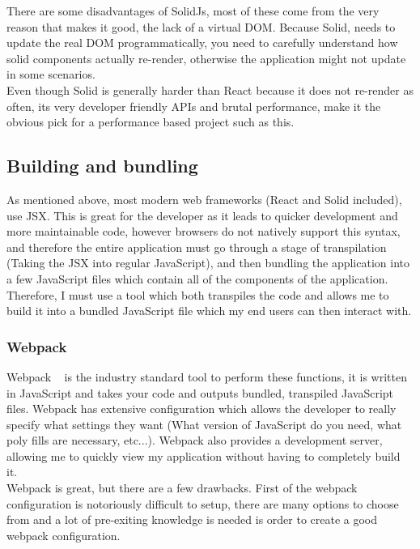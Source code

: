 \documentclass[titlepage]{article}
\begin{document}
There are some disadvantages of SolidJs, most of these come from the very reason that makes it good, the lack of a virtual DOM. Because Solid, needs to update the real DOM programmatically, you need to carefully understand how solid components actually re-render, otherwise the application might not update in some scenarios. \\

Even though Solid is generally harder than React because it does not re-render as often, its very developer friendly APIs and brutal performance, make it the obvious pick for a performance based project such as this.

\subsection{Building and bundling}
As mentioned above, most modern web frameworks (React and Solid included), use JSX. This is great for the developer as it leads to quicker development and more maintainable code, however browsers do not natively support this syntax, and therefore the entire application must go through a stage of transpilation (Taking the JSX into regular JavaScript), and then bundling the application into a few JavaScript files which contain all of the components of the application. Therefore, I must use a tool which both transpiles the code and allows me to build it into a bundled JavaScript file which my end users can then interact with.

\subsubsection{Webpack}
Webpack ~\cite{webpack} is the industry standard tool to perform these functions, it is written in JavaScript and takes your code and outputs bundled, transpiled JavaScript files. Webpack has extensive configuration which allows the developer to really specify what settings they want (What version of JavaScript do you need, what poly fills are necessary, etc...). Webpack also provides a development server, allowing me to quickly view my application without having to completely build it. \\

Webpack is great, but there are a few drawbacks. First of the webpack configuration is notoriously difficult to setup, there are many options to choose from and a lot of pre-exiting knowledge is needed is order to create a good webpack configuration. \\
\end{document}
